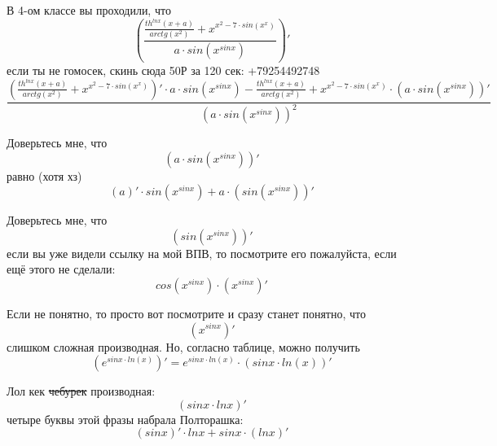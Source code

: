 \documentclass[a4paper, 12pt]{article}
\begin{document}
В 4-ом классе вы проходили, что
\begin{equation}
\left(\frac{\frac{th^{lnx}\left(x + a\right)}{arctg\left(x^{2}\right)} + x^{x^{2} - 7 \cdot sin\left(x^{x}\right)}}{a \cdot sin\left(x^{sinx}\right)} \right)'
\end{equation}
если ты не гомосек, скинь сюда 50Р за 120 сек: +79254492748
\begin{equation}
\frac{\left(\frac{th^{lnx}\left(x + a\right)}{arctg\left(x^{2}\right)} + x^{x^{2} - 7 \cdot sin\left(x^{x}\right)} \right)' \cdot a \cdot sin\left(x^{sinx}\right) - \frac{th^{lnx}\left(x + a\right)}{arctg\left(x^{2}\right)} + x^{x^{2} - 7 \cdot sin\left(x^{x}\right)}\cdot \left(a \cdot sin\left(x^{sinx}\right) \right)'}{\left(a \cdot sin\left(x^{sinx}\right) \right)^2}
\end{equation}

Доверьтесь мне, что
\begin{equation}
\left(a \cdot sin\left(x^{sinx}\right) \right)'
\end{equation}
равно (хотя хз)
\begin{equation}
\left(a \right)' \cdot sin\left(x^{sinx}\right) + a\cdot \left( sin\left(x^{sinx}\right) \right)'
\end{equation}

Доверьтесь мне, что
\begin{equation}
\left(sin\left(x^{sinx}\right) \right)'
\end{equation}
если вы уже видели ссылку на мой ВПВ, то посмотрите его пожалуйста, если ещё этого не сделали:
\begin{equation}
cos \left( x^{sinx} \right) \cdot \left( x^{sinx} \right)'
\end{equation}

Если не понятно, то просто вот посмотрите и сразу станет понятно, что
\begin{equation}
\left(x^{sinx} \right)'
\end{equation}
слишком сложная производная. Но, согласно таблице, можно получить
\begin{equation}
\left(e^{sinx\cdot ln \left(x \right)}  \right)' = e^{sinx\cdot ln \left(x \right)} \cdot \left( sinx\cdot ln \left(x \right) \right)'
\end{equation}

Лол кек \sout{чебурек} производная:
\begin{equation}
\left(sinx \cdot lnx \right)'
\end{equation}
четыре буквы этой фразы набрала Полторашка:
\begin{equation}
\left(sinx \right)' \cdot lnx + sinx\cdot \left( lnx \right)'
\end{equation}
\end{document}
